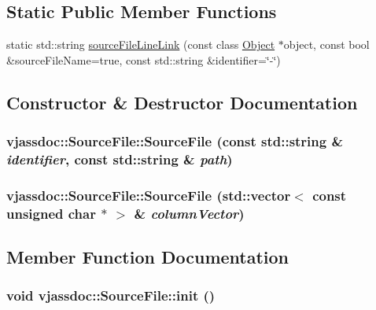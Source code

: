 \subsection*{Static Public Member Functions}
\begin{CompactItemize}
\item 
static std::string \hyperlink{classvjassdoc_1_1SourceFile_5442b71bdf46f52e3aec90257e6a3dcb}{sourceFileLineLink} (const class \hyperlink{classvjassdoc_1_1Object}{Object} $\ast$object, const bool \&sourceFileName=true, const std::string \&identifier=\char`\"{}-\char`\"{})
\end{CompactItemize}


\subsection{Constructor \& Destructor Documentation}
\hypertarget{classvjassdoc_1_1SourceFile_e4dd92032b7498bf71ddb71daa30253a}{
\subsubsection{\setlength{\rightskip}{0pt plus 5cm}vjassdoc::SourceFile::SourceFile (const std::string \& {\em identifier}, const std::string \& {\em path})}}
\label{classvjassdoc_1_1SourceFile_e4dd92032b7498bf71ddb71daa30253a}


\hypertarget{classvjassdoc_1_1SourceFile_e0d55673a13f69697ed0dd2130b9535b}{
\subsubsection{\setlength{\rightskip}{0pt plus 5cm}vjassdoc::SourceFile::SourceFile (std::vector$<$ const unsigned char $\ast$ $>$ \& {\em columnVector})}}
\label{classvjassdoc_1_1SourceFile_e0d55673a13f69697ed0dd2130b9535b}




\subsection{Member Function Documentation}
\hypertarget{classvjassdoc_1_1SourceFile_e2aa3f034bbb18de023ce9a21dfa78d1}{
\subsubsection{\setlength{\rightskip}{0pt plus 5cm}void vjassdoc::SourceFile::init ()}}
\label{classvjassdoc_1_1SourceFile_e2aa3f034bbb18de023ce9a21dfa78d1}




